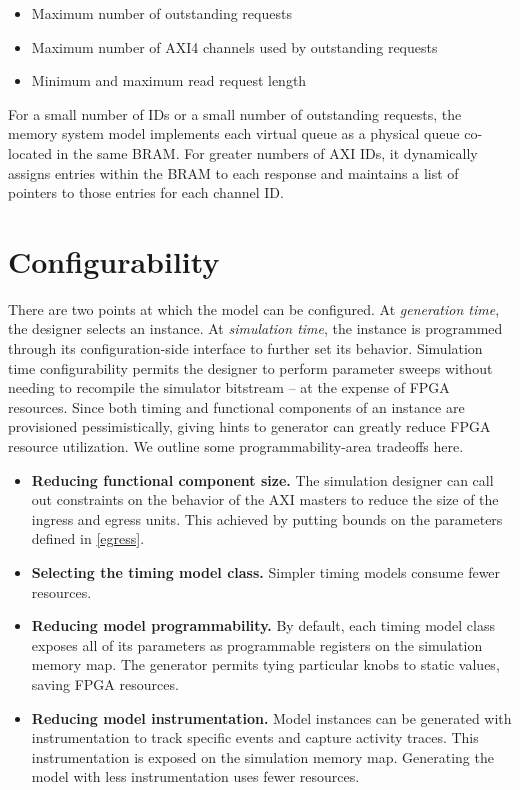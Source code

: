 \begin{itemize}
    \item Maximum number of outstanding requests
    \item Maximum number of AXI4 channels used by outstanding requests
    \item Minimum and maximum read request length
\end{itemize}

For a small number of IDs or a small number of outstanding requests, the
memory system model implements each virtual queue as a physical queue co-located in
the same BRAM. For greater numbers of AXI IDs, it dynamically assigns entries
within the BRAM to each response and maintains a list of pointers to those
entries for each channel ID.

\section{Configurability}

There are two points at which the model can be configured.  At
\textit{generation time}, the designer selects an instance. At
\textit{simulation time}, the instance is programmed through its
configuration-side interface to further set its behavior. Simulation time
configurability permits the designer to perform parameter sweeps without
needing to recompile the simulator bitstream -- at the expense of FPGA
resources. Since both timing and functional components of an instance are
provisioned pessimistically, giving hints to generator can greatly reduce FPGA
resource utilization. We outline some programmability-area tradeoffs here.

\begin{itemize}
    \item \textbf{Reducing functional component size.} The simulation designer
        can call out constraints on the behavior of the AXI masters to reduce
        the size of the ingress and egress units.  This achieved by putting
        bounds on the parameters defined in \ref{egress}.

    \item \textbf{Selecting the timing model class.} Simpler timing models
        consume fewer resources.

    \item \textbf{Reducing model programmability.} By default, each timing
        model class exposes all of its parameters as programmable registers on
        the simulation memory map. The generator permits tying particular knobs
        to static values, saving FPGA resources.

    \item \textbf{Reducing model instrumentation.} Model instances can be
        generated with instrumentation to track specific events and capture
        activity traces. This instrumentation is exposed on the simulation
        memory map. Generating the model with less instrumentation uses fewer
        resources.
\end{itemize}

